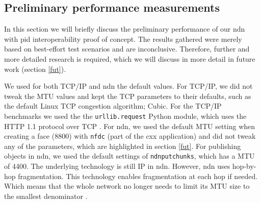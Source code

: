 

\subsection{Preliminary performance measurements}
\label{discussion-performance}
In this section we will briefly discuss the preliminary performance of our \gls{ndn} with \gls{pid} interoperability proof of concept. The results gathered were merely based on best-effort test scenarios and are inconclusive. Therefore, further and more detailed research is required, which we will discuss in more detail in future work (section \ref{fut}). 


We used for both TCP/IP and \gls{ndn} the default values.
For TCP/IP, we did not tweak the MTU values and kept the TCP parameters to their defaults, such as the default Linux TCP congestion algorithm; Cubic. For the TCP/IP benchmarks we used the the \texttt{urllib.request} Python module, which uses the HTTP 1.1 protocol over TCP \cite{urllib}. For \gls{ndn}, we used the default MTU setting when creating a face (8800) with \texttt{nfdc} (part of the \gls{cxx} application) and did not tweak any of the parameters, which are highlighted in section \ref{fut}. For publishing objects in \gls{ndn}, we used the default settings of \texttt{ndnputchunks}, which has a MTU of 4400. The underlying technology is still IP in \gls{ndn}. However, \gls{ndn} uses hop-by-hop fragmentation. This technology enables fragmentation at each hop if needed. Which means that the whole network no longer needs to limit its MTU size to the smallest denominator \cite{ndn-mtu}.

